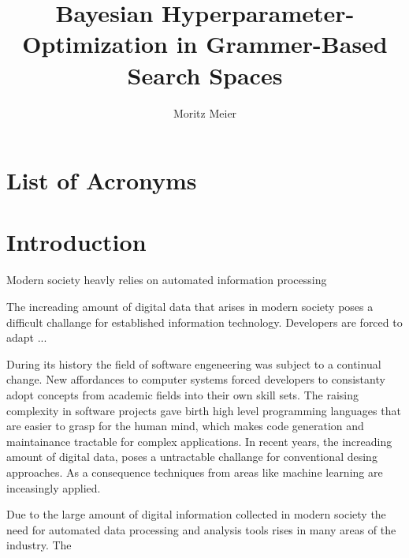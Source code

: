 \documentclass[english]{article}
\begin{document}
\title{Bayesian Hyperparameter-Optimization in Grammer-Based Search Spaces}
\author{Moritz Meier}
\maketitle
\tableofcontents
\newpage

\section*{List of Acronyms}
  \begin{acronym}
\end{acronym}

\section{Introduction}

Modern society heavly relies on automated information processing

The increading amount of digital data that arises in modern society poses a difficult challange for established information technology. Developers are forced to adapt  ...

During its history the field of software engeneering was subject to a continual change. New affordances to computer systems forced developers to consistanty adopt concepts from academic fields into their own skill sets. The raising complexity in software projects gave birth high level programming languages that are easier to grasp for the human mind, which makes code generation and maintainance tractable for complex applications.
In recent years, the increading amount of digital data, poses a untractable challange for conventional desing approaches. As a consequence techniques from  areas like machine learning are inceasingly applied.

Due to the large amount of digital information collected in modern society the need for automated data processing and analysis tools rises in many areas of the industry. The
\end{document}
